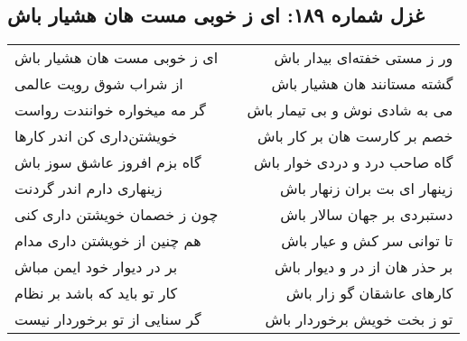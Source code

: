 \begin{center}
\section*{غزل شماره ۱۸۹: ای ز خوبی مست هان هشیار باش}
\label{sec:189}
\begin{longtable}{l p{0.5cm} r}
ای ز خوبی مست هان هشیار باش
&&
ور ز مستی خفته‌ای بیدار باش
\\
از شراب شوق رویت عالمی
&&
گشته مستانند هان هشیار باش
\\
گر مه میخواره خوانندت رواست
&&
می به شادی نوش و بی تیمار باش
\\
خویشتن‌داری کن اندر کارها
&&
خصم بر کارست هان بر کار باش
\\
گاه بزم افروز عاشق سوز باش
&&
گاه صاحب درد و دردی خوار باش
\\
زینهاری دارم اندر گردنت
&&
زینهار ای بت بران زنهار باش
\\
چون ز خصمان خویشتن داری کنی
&&
دستبردی بر جهان سالار باش
\\
هم چنین از خویشتن داری مدام
&&
تا توانی سر کش و عیار باش
\\
بر در دیوار خود ایمن مباش
&&
بر حذر هان از در و دیوار باش
\\
کار تو باید که باشد بر نظام
&&
کارهای عاشقان گو زار باش
\\
گر سنایی از تو برخوردار نیست
&&
تو ز بخت خویش برخوردار باش
\\
\end{longtable}
\end{center}
